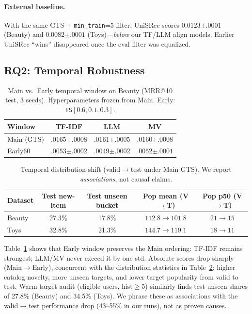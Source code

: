 \documentclass[sigconf,natbib=true,anonymous]{acmart}
\newcommand{\tfidf}{\textsc{TF-IDF}\xspace}
\begin{document}
\paragraph{External baseline.}
With the same GTS + \texttt{min\_train}=5 filter, UniSRec scores $0.0123{\scriptstyle\pm.0001}$ (Beauty) and $0.0082{\scriptstyle\pm.0001}$ (Toys)---\emph{below} our TF/LLM align models.
Earlier UniSRec ``wins'' disappeared once the eval filter was equalized.

\subsection{RQ2: Temporal Robustness}
\label{sec:rq2}

\begin{table}[t]
\centering
\caption{Main vs.\ Early temporal window on Beauty (MRR@10 test, 3 seeds).
Hyperparameters frozen from Main.
Early: \texttt{TS}$[0.6,0.1,0.3]$.}
\label{tab:early}
\small
\begin{tabular}{@{}lccc@{}}
\toprule
Window & TF-IDF & LLM & MV \\
\midrule
Main (GTS) & $\mathbf{.0165{\scriptstyle\pm.0008}}$ & $.0161{\scriptstyle\pm.0005}$ & $.0160{\scriptstyle\pm.0008}$ \\
Early60 & $\mathbf{.0053{\scriptstyle\pm.0002}}$ & $.0049{\scriptstyle\pm.0002}$ & $.0052{\scriptstyle\pm.0001}$ \\
\bottomrule
\end{tabular}
\end{table}

\begin{table}[t]
\centering
\caption{Temporal distribution shift (valid$\rightarrow$test under Main GTS).
We report \emph{associations}, not causal claims.}
\label{tab:shift}
\small
\setlength{\tabcolsep}{4pt}
\begin{tabular}{@{}lcccc@{}}
\toprule
Dataset & Test new-item & Test unseen bucket & Pop mean (V$\rightarrow$T) & Pop p50 (V$\rightarrow$T) \\
\midrule
Beauty & 27.3\% & 17.8\% & $112.8\rightarrow101.8$ & $21\rightarrow15$ \\
Toys & 32.8\% & 21.3\% & $144.7\rightarrow119.1$ & $18\rightarrow11$ \\
\bottomrule
\end{tabular}
\end{table}

Table~\ref{tab:early} shows that Early window preserves the Main ordering: \tfidf remains strongest; LLM/MV never exceed it by one std.
Absolute scores drop sharply (Main$\rightarrow$Early), concurrent with the distribution statistics in Table~\ref{tab:shift}: higher catalog novelty, more unseen targets, and lower target popularity from valid to test.
Warm-target audit (eligible users, hist$\ge$5) similarly finds test unseen shares of 27.8\% (Beauty) and 34.5\% (Toys).
We phrase these as associations with the valid$\rightarrow$test performance drop (43--55\% in our runs), not as proven causes.
\end{document}
